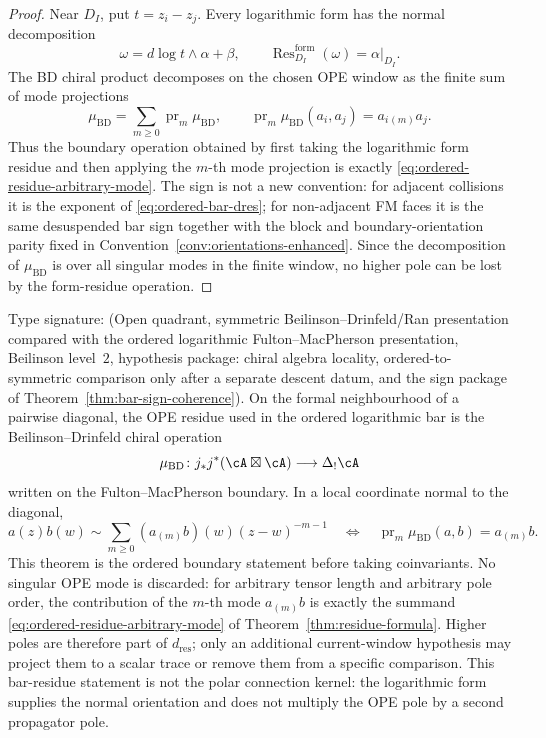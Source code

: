 \begin{proof}
Near \(D_I\), put \(t=z_i-z_j\). Every logarithmic form has the
normal decomposition
\[
\omega=d\log t\wedge\alpha+\beta,\qquad
\operatorname{Res}^{\mathrm{form}}_{D_I}(\omega)=\alpha|_{D_I}.
\]
The BD chiral product decomposes on the chosen OPE window as the
finite sum of mode projections
\[
\mu_{\mathrm{BD}}=\sum_{m\ge0}\operatorname{pr}_m\mu_{\mathrm{BD}},
\qquad
\operatorname{pr}_m\mu_{\mathrm{BD}}(a_i,a_j)=a_i{}_{(m)}a_j.
\]
Thus the boundary operation obtained by first taking the logarithmic
form residue and then applying the \(m\)-th mode projection is exactly
\eqref{eq:ordered-residue-arbitrary-mode}. The sign is not a new
convention: for adjacent collisions it is the exponent of
\eqref{eq:ordered-bar-dres}; for non-adjacent FM faces it is the same
desuspended bar sign together with the block and boundary-orientation
parity fixed in Convention~\ref{conv:orientations-enhanced}. Since
the decomposition of \(\mu_{\mathrm{BD}}\) is over all singular modes
in the finite window, no higher pole can be lost by the form-residue
operation.
\end{proof}

\begin{theorem}
\label{thm:bd-ope-residue-full-poles}
Type signature: \textup{(}Open quadrant, symmetric
Beilinson--Drinfeld/Ran presentation compared with the ordered
logarithmic Fulton--MacPherson presentation, Beilinson level~$2$,
hypothesis package: chiral algebra locality, ordered-to-symmetric
comparison only after a separate descent datum, and the sign package
of Theorem~\ref{thm:bar-sign-coherence}\textup{)}.
On the formal neighbourhood of a pairwise diagonal, the OPE residue
used in the ordered logarithmic bar is the Beilinson--Drinfeld chiral
operation
\[
\mu_{\mathrm{BD}}\colon
j_*j^*(\cA\boxtimes\cA)\longrightarrow \Delta_!\cA
\]
written on the Fulton--MacPherson boundary. In a local coordinate
normal to the diagonal,
\[
a(z)b(w)\sim
\sum_{m\ge0}(a_{(m)}b)(w)(z-w)^{-m-1}
\quad\Longleftrightarrow\quad
\operatorname{pr}_m\mu_{\mathrm{BD}}(a,b)=a_{(m)}b .
\]
This theorem is the ordered boundary statement before taking
coinvariants. No singular OPE mode is discarded: for arbitrary tensor
length and arbitrary pole order, the contribution of the $m$-th mode
\(a_{(m)}b\) is exactly the summand
\eqref{eq:ordered-residue-arbitrary-mode} of
Theorem~\ref{thm:residue-formula}. Higher poles are therefore part of
$d_{\mathrm{res}}$; only an additional current-window hypothesis may
project them to a scalar trace or remove them from a specific
comparison. This bar-residue statement is not the polar connection
kernel: the logarithmic form supplies the normal orientation and does
not multiply the OPE pole by a second propagator pole.
\end{theorem}

